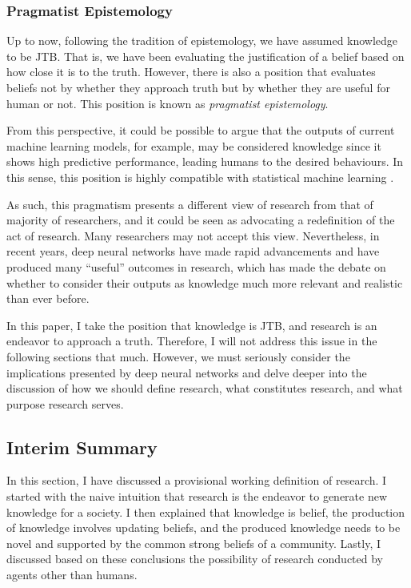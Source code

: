 \subsubsection{Pragmatist Epistemology}
Up to now, following the tradition of epistemology, we have assumed knowledge to be JTB. That is, we have been evaluating the justification of a belief based on how close it is to the truth. However, there is also a position that evaluates beliefs not by whether they approach truth but by whether they are useful for human or not. This position is known as \textit{pragmatist epistemology}. 

From this perspective, it could be possible to argue that the outputs of current machine learning models, for example, may be considered knowledge since it shows high predictive performance, leading humans to the desired behaviours. In this sense, this position is highly compatible with statistical machine learning \cite{otsuka2022thinking}.

As such, this pragmatism presents a different view of research from that of majority of researchers, and it could be seen as advocating a redefinition of the act of research. Many researchers may not accept this view. Nevertheless, in recent years, deep neural networks have made rapid advancements and have produced many ``useful'' outcomes in research, which has made the debate on whether to consider their outputs as knowledge much more relevant and realistic than ever before.

In this paper, I take the position that knowledge is JTB, and research is an endeavor to approach a truth. Therefore, I will not address this issue in the following sections that much. However, we must seriously consider the implications presented by deep neural networks and delve deeper into the discussion of how we should define research, what constitutes research, and what purpose research serves.

\subsection{Interim Summary}
In this section, I have discussed a provisional working definition of research. I started with the naive intuition that research is the endeavor to generate new knowledge for a society. I then explained that knowledge is belief, the production of knowledge involves updating beliefs, and the produced knowledge needs to be novel and supported by the common strong beliefs of a community. Lastly, I discussed based on these conclusions the possibility of research conducted by agents other than humans.

